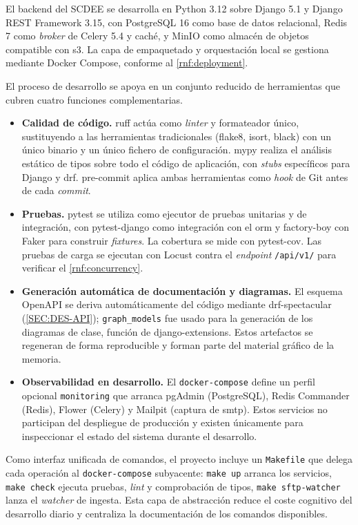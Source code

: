 El backend del SCDEE se desarrolla en Python 3.12 sobre Django 5.1 y
Django REST Framework 3.15, con PostgreSQL 16 como base de datos
relacional, Redis 7 como \textit{broker} de Celery 5.4 y caché, y MinIO
como almacén de objetos compatible con \acs{s3}. La capa de empaquetado
y orquestación local se gestiona mediante Docker Compose, conforme al
\cref{rnf:deployment}.

El proceso de desarrollo se apoya en un conjunto reducido de herramientas
que cubren cuatro funciones complementarias.

\begin{itemize}

  \item \textbf{Calidad de código.} ruff actúa como \textit{linter} y
  formateador único, sustituyendo a las herramientas tradicionales
  (flake8, isort, black) con un único binario y un único fichero de
  configuración. mypy realiza el análisis estático de tipos sobre todo
  el código de aplicación, con \textit{stubs} específicos para Django y
  \acs{drf}. pre-commit aplica ambas herramientas como \textit{hook} de
  Git antes de cada \textit{commit}.

  \item \textbf{Pruebas.} pytest se utiliza como ejecutor de pruebas
  unitarias y de integración, con pytest-django como integración con el
  \acs{orm} y factory-boy con Faker para construir \textit{fixtures}.
  La cobertura se mide con pytest-cov. Las pruebas de carga se ejecutan
  con Locust contra el \textit{endpoint} \texttt{/api/v1/} para verificar
  el \cref{rnf:concurrency}.

  \item \textbf{Generación automática de documentación y diagramas.} El
  esquema OpenAPI se deriva automáticamente del código mediante
  drf-spectacular (\cref{SEC:DES-API}); \texttt{graph\_models} fue
  usado para la generación de los diagramas de clase, función de
  django-extensions. Estos artefactos
  se regeneran de forma reproducible y forman parte del material gráfico
  de la memoria.

  \item \textbf{Observabilidad en desarrollo.} El \texttt{docker-compose}
  define un perfil opcional \texttt{monitoring} que arranca pgAdmin
  (PostgreSQL), Redis Commander (Redis), Flower (Celery) y Mailpit
  (captura de \acs{smtp}). Estos servicios no participan del despliegue
  de producción y existen únicamente para inspeccionar el estado del
  sistema durante el desarrollo.

\end{itemize}

Como interfaz unificada de comandos, el proyecto incluye un
\texttt{Makefile} que delega cada operación al \texttt{docker-compose}
subyacente: \texttt{make up} arranca los servicios, \texttt{make check}
ejecuta pruebas, \textit{lint} y comprobación de tipos,
\texttt{make sftp-watcher} lanza el \textit{watcher} de ingesta. Esta
capa de abstracción reduce el coste cognitivo del desarrollo diario y
centraliza la documentación de los comandos disponibles.
